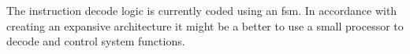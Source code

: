The instruction decode logic is currently coded using an \ac{fsm}.  In accordance with creating an expansive architecture it might be a better to use a small processor to decode and control system functions.

\iffalse
  \item Half-Precision PE
  \item Additional PE pipelining
  \item Systolic PE
\fi

